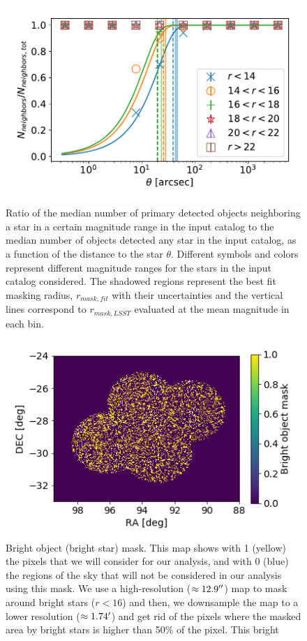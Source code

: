 \documentclass[twocolumn]{aastex62}
\begin{document}
\begin{figure}
\centering
\includegraphics[width=0.9\columnwidth]{bright_object_masking}
\caption{Ratio of the median number of primary detected objects neighboring a star in a certain magnitude range in the input catalog to the median number of objects detected any star in the input catalog, as a function of the distance to the star $\theta$. Different symbols and colors represent different magnitude ranges for the stars in the input catalog considered. The shadowed regions represent the best fit masking radius, $r_{mask,fit}$ with their uncertainties and the vertical lines correspond to $r_{mask,LSST}$ evaluated at the mean magnitude in each bin.}
\label{fig:bright_object_masking}
\end{figure}
\begin{figure}
\centering
\includegraphics[width=0.9\columnwidth]{bo_mask}
\caption{Bright object (bright star) mask. This map shows with 1 (yellow) the pixels that we will consider for our analysis, and with 0 (blue) the regions of the sky that will not be considered in our analysis using this mask. We use a high-resolution ($\approx 12.9 \mbox{$^{\prime\prime}$}$) map to mask around bright stars ($r < 16$) and then, we downsample the map to a lower resolution ($\approx 1.74 \mbox{$^\prime$}$) and get rid of the pixels where the masked area by bright stars is higher than 50\% of the pixel. This bright}
\label{fig:bo_mask}
\end{figure} 
\end{document}
